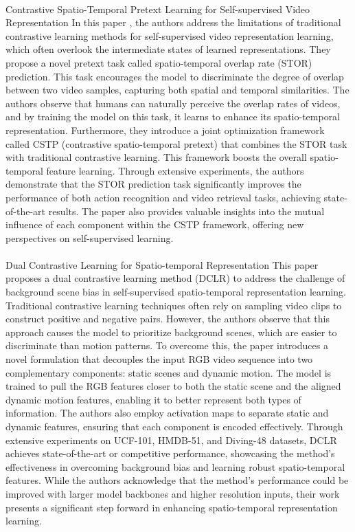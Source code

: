 \documentclass[11pt,a4paper]{report}
\begin{document}
\paragraph{} Contrastive Spatio-Temporal Pretext Learning for Self-supervised Video Representation
In this paper \cite{Zhang2022}, the authors address the limitations of traditional contrastive learning methods for self-supervised video representation learning, which often overlook the intermediate states of learned representations. They propose a novel pretext task called spatio-temporal overlap rate (STOR) prediction. This task encourages the model to discriminate the degree of overlap between two video samples, capturing both spatial and temporal similarities. The authors observe that humans can naturally perceive the overlap rates of videos, and by training the model on this task, it learns to enhance its spatio-temporal representation. Furthermore, they introduce a joint optimization framework called CSTP (contrastive spatio-temporal pretext) that combines the STOR task with traditional contrastive learning. This framework boosts the overall spatio-temporal feature learning. Through extensive experiments, the authors demonstrate that the STOR prediction task significantly improves the performance of both action recognition and video retrieval tasks, achieving state-of-the-art results. The paper also provides valuable insights into the mutual influence of each component within the CSTP framework, offering new perspectives on self-supervised learning.

\paragraph{} Dual Contrastive Learning for Spatio-temporal Representation
This paper \cite{Ding2022} proposes a dual contrastive learning method (DCLR) to address the challenge of background scene bias in self-supervised spatio-temporal representation learning. Traditional contrastive learning techniques often rely on sampling video clips to construct positive and negative pairs. However, the authors observe that this approach causes the model to prioritize background scenes, which are easier to discriminate than motion patterns. To overcome this, the paper introduces a novel formulation that decouples the input RGB video sequence into two complementary components: static scenes and dynamic motion. The model is trained to pull the RGB features closer to both the static scene and the aligned dynamic motion features, enabling it to better represent both types of information. The authors also employ activation maps to separate static and dynamic features, ensuring that each component is encoded effectively. Through extensive experiments on UCF-101, HMDB-51, and Diving-48 datasets, DCLR achieves state-of-the-art or competitive performance, showcasing the method's effectiveness in overcoming background bias and learning robust spatio-temporal features. While the authors acknowledge that the method's performance could be improved with larger model backbones and higher resolution inputs, their work presents a significant step forward in enhancing spatio-temporal representation learning.
\end{document}
